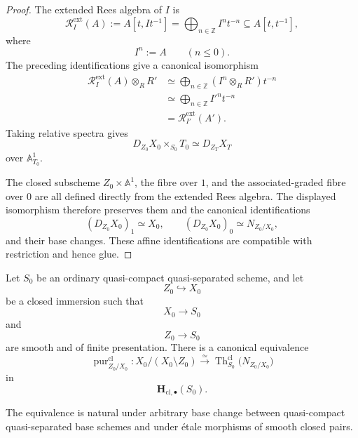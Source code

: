 \begin{proof}
The extended Rees algebra of \(I\) is
\[
    \mathcal R_I^{\mathrm{ext}}(A)
    :=
    A[t,It^{-1}]
    =
    \bigoplus_{n\in\mathbb Z}
    I^n t^{-n}
    \subseteq
    A[t,t^{-1}],
\]
where
\[
    I^n:=A
    \qquad
    (n\leq0).
\]
The preceding identifications give a canonical isomorphism
\[
\begin{aligned}
    \mathcal R_I^{\mathrm{ext}}(A)
    \otimes_RR'
    &\simeq
    \bigoplus_{n\in\mathbb Z}
    (I^n\otimes_RR')t^{-n}
    \\
    &\simeq
    \bigoplus_{n\in\mathbb Z}
    I'^n t^{-n}
    \\
    &=
    \mathcal R_{I'}^{\mathrm{ext}}(A').
\end{aligned}
\]
Taking relative spectra gives
\[
    D_{Z_0}X_0
    \times_{S_0}
    T_0
    \simeq
    D_{Z_T}X_T
\]
over \(\mathbb A^1_{T_0}\).

The closed subscheme \(Z_0\times\mathbb A^1\), the fibre over \(1\),
and the associated-graded fibre over \(0\) are all defined directly
from the extended Rees algebra.  The displayed isomorphism therefore
preserves them and the canonical identifications
\[
    (D_{Z_0}X_0)_1
    \simeq
    X_0,
    \qquad
    (D_{Z_0}X_0)_0
    \simeq
    N_{Z_0/X_0},
\]
and their base changes.  These affine identifications are compatible
with restriction and hence glue.
\end{proof}

\begin{theorem}
\label{thm:ordinary-homotopy-purity-functorial}
Let \(S_0\) be an ordinary quasi-compact quasi-separated scheme, and let
\[
    Z_0
    \hookrightarrow
    X_0
\]
be a closed immersion such that
\[
    X_0
    \longrightarrow
    S_0
\]
and
\[
    Z_0
    \longrightarrow
    S_0
\]
are smooth and of finite presentation.  There is a canonical
equivalence
\[
    \operatorname{pur}^{\mathrm{cl}}_{Z_0/X_0}
    \colon
    X_0/(X_0\setminus Z_0)
    \xrightarrow{\simeq}
    \operatorname{Th}^{\mathrm{cl}}_{S_0}
    \bigl(
        N_{Z_0/X_0}
    \bigr)
\]
in
\[
    \mathbf H_{\mathrm{cl},\bullet}(S_0).
\]

The equivalence is natural under arbitrary base change between
quasi-compact quasi-separated base schemes and under étale morphisms of
smooth closed pairs.
\end{theorem}

